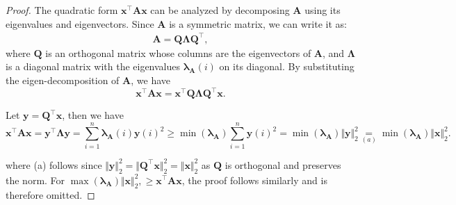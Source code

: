 \begin{proof}
The quadratic form $\boldsymbol{x}^{\top} \boldsymbol{A} \boldsymbol{x}$ can be analyzed by decomposing $\boldsymbol{A}$ using its eigenvalues and eigenvectors. Since $\boldsymbol{A}$ is a symmetric matrix, we can write it as:
\[
\begin{aligned}
\boldsymbol{A} = \boldsymbol{Q} \boldsymbol{\Lambda} \boldsymbol{Q}^{\top},
\end{aligned}
\]
where $\boldsymbol{Q}$ is an orthogonal matrix whose columns are the eigenvectors of $\boldsymbol{A}$, and $\boldsymbol{\Lambda}$ is a diagonal matrix with the eigenvalues $\boldsymbol{\lambda_{A}}(i)$ on its diagonal.
By substituting the eigen-decomposition of $\boldsymbol{A}$, we have
\[
\boldsymbol{x}^{\top} \boldsymbol{A} \boldsymbol{x} = \boldsymbol{x}^{\top} \boldsymbol{Q} \boldsymbol{\Lambda} \boldsymbol{Q}^{\top} \boldsymbol{x}.
\]

Let $\boldsymbol{y} = \boldsymbol{Q}^{\top} \boldsymbol{x}$, then we have
\[
\boldsymbol{x}^{\top} \boldsymbol{A} \boldsymbol{x} = \boldsymbol{y}^{\top} \boldsymbol{\Lambda} \boldsymbol{y}
=
\sum_{i=1}^{n} \boldsymbol{\lambda_{A}}(i) \boldsymbol{y}(i)^2
\geq 
\min \left( {\boldsymbol{\lambda_{A}}} \right) \sum_{i=1}^{n} \boldsymbol{y}(i)^2
=
\min \left( {\boldsymbol{\lambda_{A}}} \right) \Vert \boldsymbol{y} \Vert_2^2
\underset{(a)}{=}
\min \left( {\boldsymbol{\lambda_{A}}} \right) \Vert \boldsymbol{x} \Vert_2^2.
\]

where (a) follows since $\Vert \boldsymbol{y} \Vert_2^2 = \Vert \boldsymbol{Q}^{\top} \boldsymbol{x} \Vert_2^2 = \Vert \boldsymbol{x} \Vert_2^2$ as 
$\boldsymbol{Q}$ is orthogonal and preserves the norm.
For $\max \left( {\boldsymbol{\lambda_{A}}} \right) \Vert \boldsymbol{x} \Vert_2^2,
\geq
\boldsymbol{x}^{\top} \boldsymbol{A} \boldsymbol{x}$, the proof follows similarly and is therefore omitted.
\end{proof}

